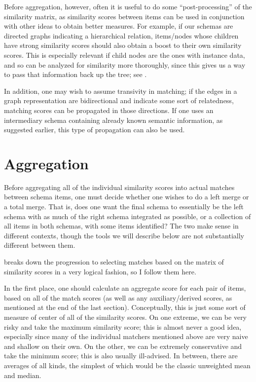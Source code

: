 \documentclass{datamade}
\theoremstyle{definition}
\theoremstyle{remark}
\begin{document}
Before aggregation, however, often it is useful to do some ``post-processing'' of the similarity matrix, as similarity scores between items can be used in conjunction with other ideas to obtain better measures. For example, if our schemas are directed graphs indicating a hierarchical relation, items/nodes whose children have strong similarity scores should also obtain a boost to their own similarity scores. This is especially relevant if child nodes are the ones with instance data, and so can be analyzed for similarity more thoroughly, since this gives us a way to pass that information back up the tree; see \cite{comainstance}. 

In addition, one may wish to assume transivity in matching; if the edges in a graph representation are bidirectional and indicate some sort of relatedness, matching scores can be propagated in those directions. If one uses an intermediary schema containing already known semantic information, as suggested earlier, this type of propagation can also be used.

\section{Aggregation}

Before aggregating all of the individual similarity scores into actual matches between schema items, one must decide whether one wishes to do a left merge or a total merge. That is, does one want the final schema to essentially be the left schema with as much of the right schema integrated as possible, or a collection of all items in both schemas, with some items identified? The two make sense in different contexts, though the tools we will describe below are not substantially different between them.

\cite{coma} breaks down the progression to selecting matches based on the matrix of similarity scores in a very logical fashion, so I follow them here. 

In the first place, one should calculate an aggregate score for each pair of items, based on all of the match scores (as well as any auxiliary/derived scores, as mentioned at the end of the last section). Conceptually, this is just some sort of measure of center of all of the similarity scores. On one extreme, we can be very risky and take the maximum similarity score; this is almost never a good idea, especially since many of the individual matchers mentioned above are very naive and shallow on their own. On the other, we can be extremely conservative and take the minimum score; this is also usually ill-advised. In between, there are averages of all kinds, the simplest of which would be the classic unweighted mean and median. 
\end{document}
